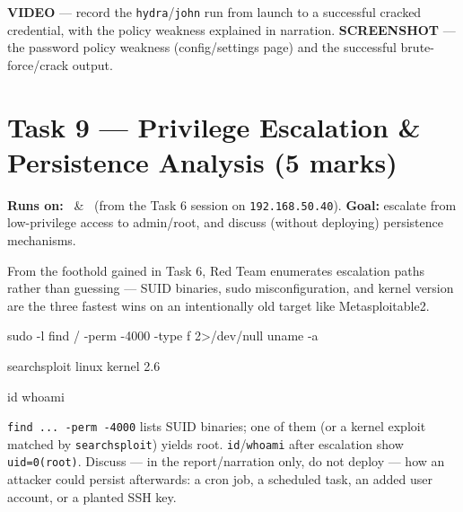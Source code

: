 \documentclass[11pt,a4paper]{article}
\begin{document}
\begin{notebox}
\textbf{VIDEO} --- record the \texttt{hydra}/\texttt{john} run from launch to a
successful cracked credential, with the policy weakness explained in narration.
\textbf{SCREENSHOT} --- the password policy weakness (config/settings page) and the
successful brute-force/crack output.
\end{notebox}

\clearpage

\section{Task 9 --- Privilege Escalation \& Persistence Analysis (5 marks)}
\textbf{Runs on:} \bruno\ \& \rayan\ (from the Task 6 session on
\texttt{192.168.50.40}). \quad\textbf{Goal:} escalate from low-privilege access to
admin/root, and discuss (without deploying) persistence mechanisms.

\begin{redbox}
From the foothold gained in Task 6, Red Team enumerates escalation paths rather than
guessing --- SUID binaries, sudo misconfiguration, and kernel version are the three
fastest wins on an intentionally old target like Metasploitable2.
\end{redbox}

\begin{cmdbox}
\begin{cmdverb}
sudo -l
find / -perm -4000 -type f 2>/dev/null
uname -a
\end{cmdverb}
\end{cmdbox}

\begin{cmdbox}
\begin{cmdverb}
searchsploit linux kernel 2.6
\end{cmdverb}
\end{cmdbox}

\begin{cmdbox}
\begin{cmdverb}
id
whoami
\end{cmdverb}
\end{cmdbox}

\begin{expectbox}
\texttt{find ... -perm -4000} lists SUID binaries; one of them (or a kernel exploit
matched by \texttt{searchsploit}) yields root. \texttt{id}/\texttt{whoami} after
escalation show \texttt{uid=0(root)}. Discuss --- in the report/narration only, do not
deploy --- how an attacker could persist afterwards: a cron job, a scheduled task, an
added user account, or a planted SSH key.
\end{expectbox}
\end{document}
